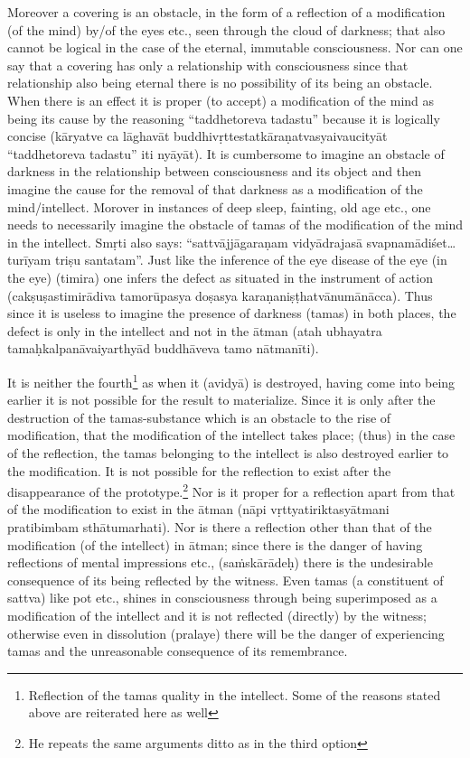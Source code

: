Moreover a covering is an obstacle, in the form of a reflection of a modification (of the mind) by/of the eyes etc., seen through the cloud of darkness; that also cannot be logical in the case of the eternal, immutable consciousness. Nor can one say that a covering has only a relationship with consciousness since that relationship also being eternal there is no possibility of its being an obstacle. When there is an effect it is proper (to accept) a modification of the mind as being its cause by the reasoning “taddhetoreva tadastu” because it is logically concise (kāryatve ca lāghavāt buddhivṛttestatkāraṇatvasyaivaucityāt “taddhetoreva tadastu” iti nyāyāt). It is cumbersome to imagine an obstacle of darkness in the relationship between consciousness and its object and then imagine the cause for the removal of that darkness as a modification of the mind/intellect. Morover in instances of deep sleep, fainting, old age etc., one needs to necessarily imagine the obstacle of tamas of the modification of the mind in the intellect. Smṛti also says: “sattvājjāgaraṇam vidyādrajasā svapnamādiśet…turīyam triṣu santatam”.  Just like the inference of the eye disease of the eye (in the eye) (timira) one infers the defect as situated in the instrument of action (cakṣuṣastimirādiva tamorūpasya doṣasya karaṇaniṣṭhatvānumānācca). Thus since it is useless to imagine the presence of  darkness (tamas) in both places, the defect is only in the intellect and not in the ātman (atah ubhayatra tamaḥkalpanāvaiyarthyād buddhāveva tamo nātmanīti).

It is neither the fourth\footnote{Reflection of the tamas quality in the intellect. Some of the reasons stated above are reiterated here as well} as when it (avidyā) is destroyed, having come into being earlier it is not possible for the result to materialize. Since it is only after the destruction of the tamas-substance which is an obstacle to the rise of modification, that the modification of the intellect takes place; (thus) in the case of the reflection, the tamas belonging to the intellect is also destroyed earlier to the modification. It is not possible for the reflection to exist after the disappearance of the prototype.\footnote{He repeats the same arguments ditto as in the third option} Nor is it proper for a reflection apart from that of the modification to exist in the ātman (nāpi vṛttyatiriktasyātmani pratibimbam sthātumarhati). Nor is there a reflection other than that of the modification (of the intellect) in ātman; since there is the danger of having reflections of mental impressions etc., (saṁskārādeḥ) there is the undesirable consequence of its being reflected by the witness. Even tamas (a constituent of sattva) like pot etc., shines in consciousness through being superimposed as a modification of the intellect and it is not reflected (directly) by the witness; otherwise even in dissolution (pralaye) there will be the danger of experiencing tamas and the unreasonable consequence of its remembrance.

